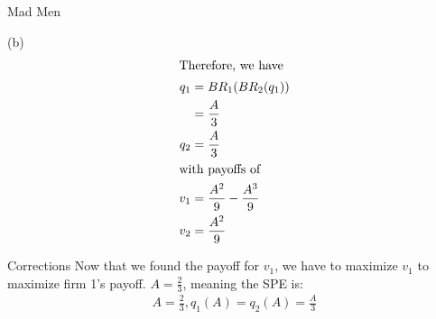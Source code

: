 \documentclass[10pt]{extarticle}
\begin{document}
\begin{problem}{Mad Men}
\begin{problem}{(b)}
\begin{align*}
        \shortintertext{Therefore, we have }
        q_1 &= BR_1(BR_2(q_1))\\
            &= \frac{A}{3}\\
        q_2 &= \frac{A}{3}\\
        \shortintertext{with payoffs of}
        v_1 &= \frac{A^2}{9} - \frac{A^3}{9}\\
        v_2 &= \frac{A^2}{9}
      \end{align*}
      \begin{problem}{Corrections}
        \color{red!50!black}
        Now that we found the payoff for $v_1$, we have to maximize $v_1$ to maximize firm 1's payoff. $A = \frac{2}{3}$, meaning the SPE is:
        \begin{align*}
          A = \frac{2}{3}, q_1(A) = q_2(A) = \frac{A}{3}
        \end{align*}
      \end{problem}
    \end{problem}
  \end{problem}
\end{document}
